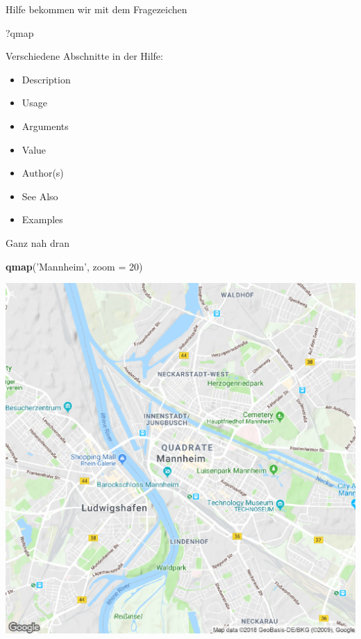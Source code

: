\documentclass[ignorenonframetext,]{beamer}
\newenvironment{Shaded}{\begin{snugshade}}{\end{snugshade}}
\newcommand{\DataTypeTok}[1]{\textcolor[rgb]{0.13,0.29,0.53}{#1}}
\newcommand{\DecValTok}[1]{\textcolor[rgb]{0.00,0.00,0.81}{#1}}
\newcommand{\KeywordTok}[1]{\textcolor[rgb]{0.13,0.29,0.53}{\textbf{#1}}}
\newcommand{\NormalTok}[1]{#1}
\newcommand{\StringTok}[1]{\textcolor[rgb]{0.31,0.60,0.02}{#1}}
\providecommand{\tightlist}{%
  \setlength{\itemsep}{0pt}\setlength{\parskip}{0pt}}
\begin{document}
\begin{frame}[fragile]{Hilfe bekommen wir mit dem Fragezeichen}
\protect\hypertarget{hilfe-bekommen-wir-mit-dem-fragezeichen}{}

\begin{Shaded}
\begin{Highlighting}[]
\NormalTok{?qmap}
\end{Highlighting}
\end{Shaded}

Verschiedene Abschnitte in der Hilfe:

\begin{itemize}
\tightlist
\item
  Description
\item
  Usage
\item
  Arguments
\item
  Value
\item
  Author(s)
\item
  See Also
\item
  Examples
\end{itemize}

\end{frame}

\begin{frame}[fragile]{Ganz nah dran}
\protect\hypertarget{ganz-nah-dran}{}

\begin{Shaded}
\begin{Highlighting}[]
\KeywordTok{qmap}\NormalTok{(}\StringTok{'Mannheim'}\NormalTok{, }\DataTypeTok{zoom =} \DecValTok{20}\NormalTok{)}
\end{Highlighting}
\end{Shaded}

\includegraphics{figure/ham_map_z20.pdf}

\end{frame}
\end{document}
